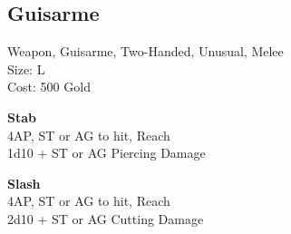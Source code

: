 \subsection{Guisarme}\label{weapon:guisarme}
Weapon, Guisarme, Two-Handed, Unusual, Melee\\
Size: L\\
Cost: 500 Gold

\textbf{Stab}\\
4AP, ST or AG to hit,  Reach\\
1d10 + \texttimes ST or AG Piercing Damage

\textbf{Slash}\\
4AP, ST or AG to hit,  Reach\\
2d10 + \texttimes ST or AG Cutting Damage
